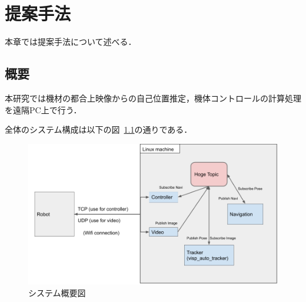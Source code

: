 \chapter{提案手法}
\label{proposed}

本章では提案手法について述べる．

\section{概要}
本研究では機材の都合上映像からの自己位置推定，機体コントロールの計算処理を遠隔PC上で行う．

全体のシステム構成は以下の図~\ref{fig:all_struct}の通りである．
\begin{figure}[htbp]
  \begin{center}
    \includegraphics[clip,width=15.0cm]{img/all_struct.png}
    \caption{システム概要図}
    \label{fig:all_struct}
  \end{center}
\end{figure}






